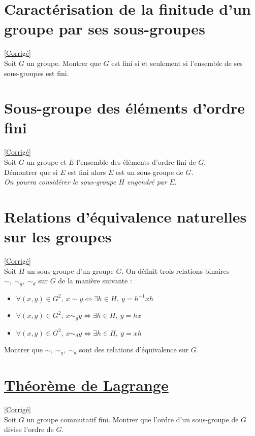 \documentclass[8pt]{book}
\begin{document}
	\section{Caractérisation de la finitude d'un groupe par ses sous-groupes }
	\label{Caractérisation de la finitude d'un groupe par ses sous-groupes}
	\textcolor{blue}{\hyperref[Caractérisation de la finitude d'un groupe par ses sous-groupes corrigé]{[Corrigé]}}\\
	Soit $G$ un groupe. Montrer que $G$ est fini si et seulement si l'ensemble de ses sous-groupes est fini.
	
	\section{Sous-groupe des éléments d'ordre fini }
	\label{Sous-groupe des éléments d'ordre fini}
	\textcolor{blue}{\hyperref[Sous-groupes des éléments d'ordre fini corrigé]{[Corrigé]}}\\
	Soit $G$ un groupe et $E$ l'ensemble des éléments d'ordre fini de $G$.\\
	Démontrer que si $E$ est fini alors $E$ est un sous-groupe de $G$.\\
	\textit{On pourra considérer le sous-groupe $H$ engendré par $E$}.
	
	\section{Relations d'équivalence naturelles sur les groupes }
	\label{Relations d'équivalence naturelles sur les groupes}
	\textcolor{blue}{\hyperref[Relations d'équivalence naturelles sur les groupes corrigé]{[Corrigé]}}\\
	Soit $H$ un sous-groupe d'un groupe $G$. On définit trois relations binaires $\sim,\ \sim_g,\ \sim_d$ sur $G$ de la manière suivante :
	\begin{itemize}
		\item $\forall (x,y)\in G^2,\ x\sim y\iff \exists h\in H,\ y=h^{-1}xh$
		\item $\forall (x,y)\in G^2,\ x\sim_g y\iff \exists h\in H,\ y=hx$
		\item $\forall (x,y)\in G^2,\ x\sim_d y\iff \exists h\in H,\ y=xh$
	\end{itemize}
	Montrer que $\sim,\ \sim_g,\ \sim_d$ sont des relations d'équivalence sur $G$.
	
	\section{\underline{Théorème de Lagrange} }
	\label{Théorème de Lagrange}
	\textcolor{blue}{\hyperref[Théorème de Lagrange corrigé]{[Corrigé]}}\\
	Soit $G$ un groupe commutatif fini. Montrer que l'ordre d'un sous-groupe de $G$ divise l'ordre de $G$.
	
\end{document}
